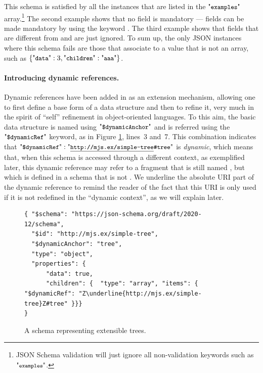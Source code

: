 This schema is satisfied by all the instances that are listed in the $\qexamples$ array.\footnote{JSON Schema validation
will just ignore all non-validation keywords such as $\qkwfn{examples}$.} The second example shows that no field is mandatory
--- fields can be made mandatory by using the keyword {\qreq}.
The third example shows that fields that are different from   and   are just ignored. %
To sum up, the only JSON instances where this schema fails are those that associate  to a value that is not an array,
such as $\{ \qkw{data} : 3, \qkw{children} : \qkw{aaa} \}$.

\paragraph{Introducing dynamic references.}
Dynamic references have been added in {\mJS} as an extension mechanism, allowing one to first define a base form of a data structure
and then to refine it, very much in the spirit of ``self'' refinement in object-oriented languages.
To this aim, the basic data structure is named using $\qdda$ and is referred using the $\qddref$ keyword,
as in Figure \ref{fig2}, lines~3 and~7.
This combination  indicates that 
$\qddref : \qkw{\underline{http://mjs.ex/simple-tree}\#tree}$ is \emph{dynamic},
which means that, when this schema is accessed through a different context, as exemplified later,
this dynamic reference may refer to a fragment that is still named , but which is defined in a schema that is not 
. We underline the absolute URI part of the dynamic reference to remind the
reader of the fact that this URI is only used if it is not redefined in the ``dynamic context'', as we will explain later.

\begin{figure}[htb!]
\begin{querybox}{}
\begin{lstlisting}[style=query,escapechar=Z]
{ "$schema": "https://json-schema.org/draft/2020-12/schema",
  "$id": "http://mjs.ex/simple-tree",
  "$dynamicAnchor": "tree",
  "type": "object",
  "properties": {
      "data": true,
      "children": {  "type": "array", "items": { "$dynamicRef": "Z\underline{http://mjs.ex/simple-tree}Z#tree" }}}
}
\end{lstlisting}
\end{querybox}
\caption{A schema representing extensible trees.}\label{fig2}
\end{figure}

